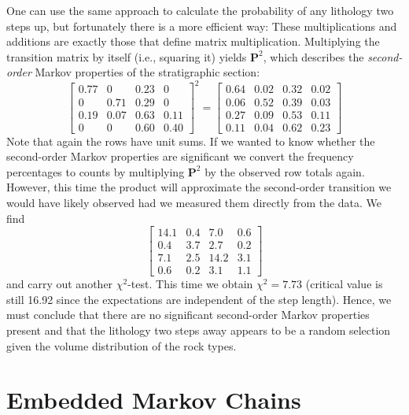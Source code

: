 One can use the same approach to calculate the probability of any lithology two steps up, but 
fortunately there is a more efficient way: These multiplications and additions are exactly those that 
define matrix multiplication.  Multiplying the transition matrix by itself (i.e., squaring it) yields
$\mathbf{P}^2$, which describes the \emph{second-order} Markov properties of the stratigraphic section:
\begin{equation}
\left [ \begin{array}{rrrr}
0.77 & 0 & 0.23 & 0 \\
0 & 0.71 & 0.29 & 0 \\
0.19 & 0.07 & 0.63 & 0.11 \\
0 & 0 & 0.60 & 0.40 \end{array} \right ]^2 = \left [ \begin{array}{rrrr}
0.64 & 0.02 & 0.32 & 0.02 \\
0.06 & 0.52 & 0.39 & 0.03\\
0.27 & 0.09 & 0.53 & 0.11 \\
0.11 & 0.04 & 0.62 & 0.23
\end{array} \right ]
\end{equation}
Note that again the rows have unit sums.  If we wanted to know whether the second-order Markov 
properties are significant we convert the frequency percentages to counts by multiplying $\mathbf{P}^2$
by the observed row totals again.  However, this time the product will approximate the second-order
transition we would have likely observed had we measured them directly from the data.  We find
\begin{equation}
\left[ \begin{array}{rrrr}
14.1 & 0.4 & 7.0 & 0.6\\
0.4 & 3.7 & 2.7 & 0.2 \\
7.1 & 2.5 & 14.2 & 3.1 \\
0.6 & 0.2 & 3.1 & 1.1
\end{array} \right ]
\end{equation}
and carry out another 
$\chi^2$-test.  This time we obtain $\chi^2 = 7.73$ (critical value is still 16.92 since the expectations
are independent of the step length).  Hence, we must conclude that there are no 
significant second-order Markov properties present and that the lithology two steps away appears to 
be a random selection given the volume distribution of the rock types.

\section{Embedded Markov Chains}
\label{sec:embmarkov}

